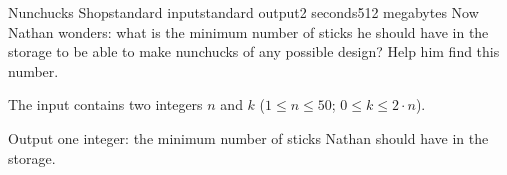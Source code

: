 \begin{problem}{Nunchucks Shop}{standard input}{standard output}{2 seconds}{512 megabytes}
Now Nathan wonders: what is the minimum number of sticks he should have in the storage to be able to make nunchucks of any possible design? Help him find this number.

\InputFile
The input contains two integers $n$ and $k$ ($1\le n\le 50$; $0\le k\le 2\cdot n$).

\OutputFile
Output one integer: the minimum number of sticks Nathan should have in the storage.

\Examples

\begin{example}
%
%
%
%
\end{example}

\end{problem}

